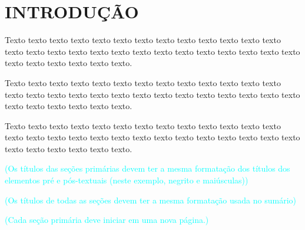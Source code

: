 
\chapter{INTRODUÇÃO}
\label{chap:introducao}


Texto texto texto texto texto texto texto texto texto texto texto texto texto texto texto texto texto texto texto texto texto texto texto texto texto texto texto texto texto texto texto texto texto.

Texto texto texto texto texto texto texto texto texto texto texto texto texto texto texto texto texto texto texto texto texto texto texto texto texto texto texto texto texto texto texto texto texto.
	
Texto texto texto texto texto texto texto texto texto texto texto texto texto texto texto texto texto texto texto texto texto texto texto texto texto texto texto texto texto texto texto texto texto.

\noindent\textcolor{cyan}{(Os títulos das seções primárias devem ter a mesma formatação dos títulos dos elementos pré e pós-textuais (neste exemplo, negrito e maiúsculas))}

\noindent\textcolor{cyan}{(Os títulos de todas as seções devem ter a mesma formatação usada no sumário)}

\noindent\textcolor{cyan}{(Cada seção primária deve iniciar em uma nova página.)}
